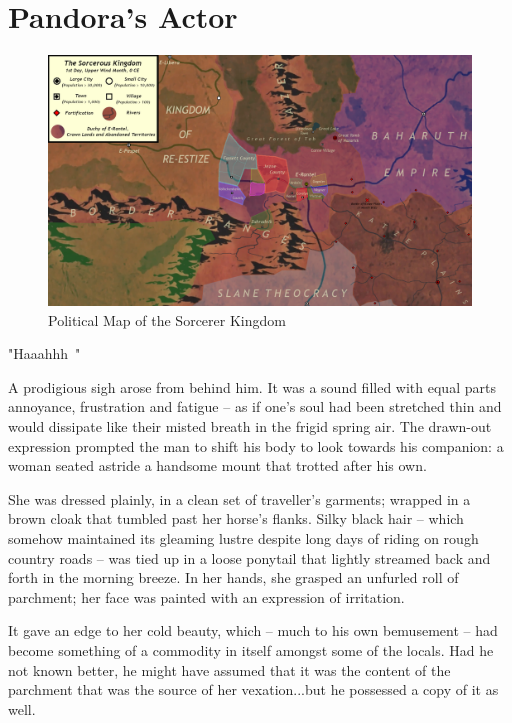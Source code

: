 

\chapter{Pandora's Actor}

\begin{figure}
    \centering
    \includegraphics[width=1\linewidth]{images/ViGYZcC.png}
    \caption*{Political Map of the Sorcerer Kingdom}
\end{figure}

"Haaahhh~"


A prodigious sigh arose from behind him. It was a sound filled with equal parts annoyance, frustration and fatigue – as if one’s soul had been stretched thin and would dissipate like their misted breath in the frigid spring air. The drawn-out expression prompted the man to shift his body to look towards his companion: a woman seated astride a handsome mount that trotted after his own.

 

She was dressed plainly, in a clean set of traveller’s garments; wrapped in a brown cloak that tumbled past her horse’s flanks. Silky black hair – which somehow maintained its gleaming lustre despite long days of riding on rough country roads – was tied up in a loose ponytail that lightly streamed back and forth in the morning breeze. In her hands, she grasped an unfurled roll of parchment; her face was painted with an expression of irritation.

 

It gave an edge to her cold beauty, which – much to his own bemusement – had become something of a commodity in itself amongst some of the locals. Had he not known better, he might have assumed that it was the content of the parchment that was the source of her vexation...but he possessed a copy of it as well.

